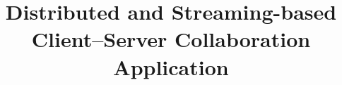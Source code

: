 \documentclass[oneside]{hcmut-report}
\title{Distributed and Streaming-based\\Client--Server Collaboration Application}
\begin{document}
\coverpage
\tableofcontents
\clearpage








\end{document}
